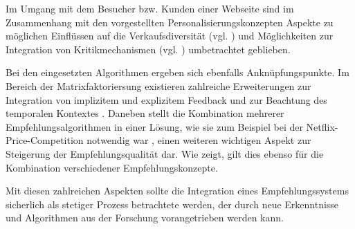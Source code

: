 Im Umgang mit dem Besucher bzw. Kunden einer Webseite sind im Zusammenhang mit den vorgestellten Personalisierungskonzepten Aspekte zu möglichen Einflüssen auf die Verkaufsdiversität (vgl. \citep{Fleder09}) und Möglichkeiten zur Integration von Kritikmechanismen (vgl. \citep{hb_13}) umbetrachtet geblieben.

Bei den eingesetzten Algorithmen ergeben sich ebenfalls Anknüpfungspunkte. Im Bereich der Matrixfaktoriersung existieren zahlreiche Erweiterungen zur Integration von implizitem und explizitem Feedback \citep{Joachims05} und zur Beachtung des temporalen Kontextes \citep{Boughareb11}. Daneben stellt die Kombination mehrerer Empfehlungsalgorithmen in einer Lösung, wie sie zum Beispiel bei der Netflix-Price-Competition notwendig war \citep{netflix2012_2}, einen weiteren wichtigen Aspekt zur Steigerung der Empfehlungsqualität dar. Wie \citep{Forbes11} zeigt, gilt dies ebenso  für die Kombination verschiedener Empfehlungskonzepte. 

Mit diesen zahlreichen Aspekten sollte die Integration eines Empfehlungssystems sicherlich als stetiger Prozess betrachtete werden, der durch neue Erkenntnisse und Algorithmen aus der Forschung vorangetrieben werden kann.



